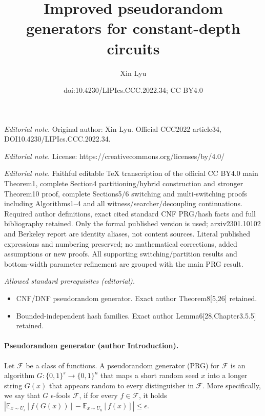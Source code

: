\documentclass[10pt,a4paper]{article}
\title{Improved pseudorandom generators for constant-depth circuits}
\author{Xin Lyu}
\date{doi:10.4230/LIPIcs.CCC.2022.34; CC BY4.0}
\begin{document}
\maketitle
\noindent\textit{Editorial note.} Original author: Xin Lyu. Official CCC2022 article34, DOI10.4230/LIPIcs.CCC.2022.34.\par\medskip
\noindent\textit{Editorial note.} License: https://creativecommons.org/licenses/by/4.0/\par\medskip
\noindent\textit{Editorial note.} Faithful editable TeX transcription of the official CC BY4.0 main Theorem1, complete Section4 partitioning/hybrid construction and stronger Theorem10 proof, complete Sections5/6 switching and multi-switching proofs including Algorithms1--4 and all witness/searcher/decoupling continuations. Required author definitions, exact cited standard CNF PRG/hash facts and full bibliography retained. Only the formal published version is used; arxiv2301.10102 and Berkeley report are identity aliases, not content sources. Literal published expressions and numbering preserved; no mathematical corrections, added assumptions or new proofs. All supporting switching/partition results and bottom-width parameter refinement are grouped with the main PRG result.\par\medskip
\noindent\textit{Allowed standard prerequisites (editorial).}\begin{itemize}
\item CNF/DNF pseudorandom generator. Exact author Theorem8[5,26] retained.
\item Bounded-independent hash families. Exact author Lemma6[28,Chapter3.5.5] retained.
\end{itemize}\medskip
\paragraph{Pseudorandom generator (author Introduction).} Let $\mathcal F$ be a class of functions. A pseudorandom generator (PRG) for $\mathcal F$ is an algorithm $G:\{0,1\}^s\to\{0,1\}^n$ that maps a short random seed $x$ into a longer string $G(x)$ that appears random to every distinguisher in $\mathcal F$. More specifically, we say that $G$ $\epsilon$-fools $\mathcal F$, if for every $f\in\mathcal F$, it holds $|\mathbb E_{x\sim U_s}[f(G(x))]-\mathbb E_{x\sim U_n}[f(x)]|\le\epsilon$.
\end{document}
